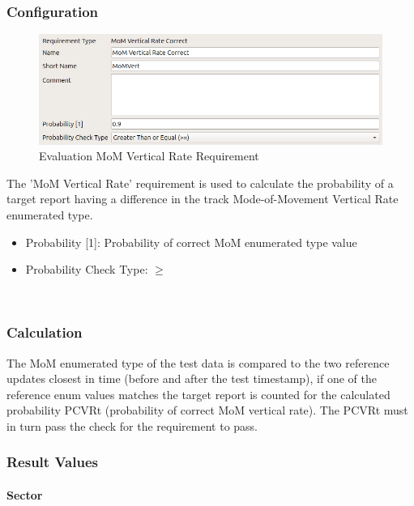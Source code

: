 \subsubsection{Configuration}

\begin{figure}[H]
    \includegraphics[width=14cm,frame]{figures/eval_req_mom_vert.png}
  \caption{Evaluation MoM Vertical Rate Requirement}
\end{figure}

The 'MoM Vertical Rate’ requirement is used to calculate the probability of a target report having a difference in the track Mode-of-Movement Vertical Rate enumerated type. 

\begin{itemize}  
\item Probability [1]: Probability of correct MoM enumerated type value
\item Probability Check Type: $\geq$
\end{itemize}
\ \\


\subsubsection{Calculation}

The MoM enumerated type of the test data is compared to the two reference updates closest in time (before and after the test timestamp), if one of the reference enum values matches the target report is counted for the calculated probability PCVRt (probability of correct MoM vertical rate). The PCVRt must in turn pass the check for the requirement to pass. 

\subsubsection{Result Values}

\paragraph{Sector}

